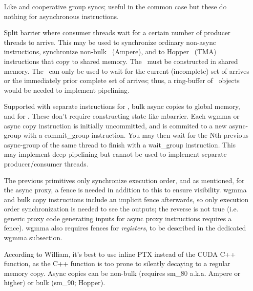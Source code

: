 \filbreak
{} Like  and cooperative group syncs; useful in the common case but these do nothing for asynchronous instructions.

\filbreak
{} Split barrier where consumer threads wait for a certain number of producer threads to arrive.
This may be used to synchronize ordinary non-async instructions, synchronize non-bulk \cpAsync\ (Ampere), and to Hopper \cpAsyncBulk\ (TMA) instructions that copy to shared memory.
The \mbarrier\ must be constructed in shared memory.
The \mbarrier\ can only be used to wait for the current (incomplete) set of arrives or the immediately prior complete set of arrives; thus, a ring-buffer of \mbarrier\ objects would be needed to implement pipelining.

\filbreak
{} Supported with separate instructions for , bulk async copies to global memory, and for .
These don't require constructing state like mbarrier.
Each wgmma or async copy instruction is initially uncommitted, and is commited to a new async-group with a commit\_group instruction.
You may then wait for the Nth previous async-group of the same thread to finish with a wait\_group instruction.
This may implement deep pipelining but cannot be used to implement separate producer/consumer threads.

\filbreak
{} The previous primitives only synchronize execution order, and as mentioned, for the async proxy, a fence is needed in addition to this to ensure visibility.
wgmma and bulk copy instructions include an implicit fence afterwards, so only execution order synchronization is needed to see the outputs; the reverse is not true (i.e. generic proxy code generating inputs for async proxy instructions requires a fence).
wgmma also requires fences for \textit{registers}, to be described in the dedicated wgmma subsection.

\filbreak
{}

According to William, it's best to use inline PTX instead of the CUDA C++  function, as the C++ function is too prone to silently decaying to a regular memory copy. Async copies can be non-bulk (requires sm\_80 a.k.a. Ampere or higher) or bulk (sm\_90; Hopper).

